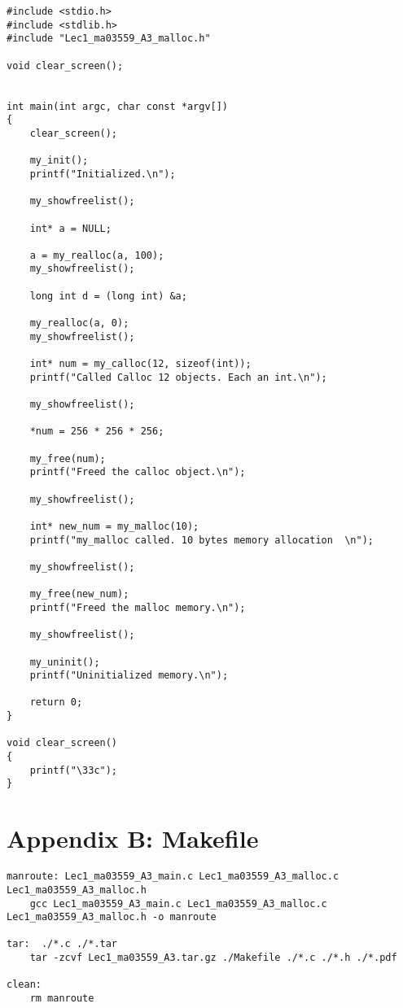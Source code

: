 \documentclass[a4paper]{article}
\begin{document}
\begin{verbatim}
#include <stdio.h>
#include <stdlib.h>
#include "Lec1_ma03559_A3_malloc.h"

void clear_screen();


int main(int argc, char const *argv[])
{
	clear_screen();

	my_init();
	printf("Initialized.\n");

	my_showfreelist();

	int* a = NULL;

	a = my_realloc(a, 100);
	my_showfreelist();

	long int d = (long int) &a;

	my_realloc(a, 0);
	my_showfreelist();

	int* num = my_calloc(12, sizeof(int));
	printf("Called Calloc 12 objects. Each an int.\n");
	
	my_showfreelist();

	*num = 256 * 256 * 256;
	
	my_free(num);
	printf("Freed the calloc object.\n");

	my_showfreelist();

	int* new_num = my_malloc(10);
	printf("my_malloc called. 10 bytes memory allocation  \n");

	my_showfreelist();

	my_free(new_num);
	printf("Freed the malloc memory.\n");
	
	my_showfreelist();
	
	my_uninit();
	printf("Uninitialized memory.\n");
	
	return 0;
}

void clear_screen()
{
	printf("\33c");
}
\end{verbatim}

\section*{Appendix B: Makefile}
\begin{verbatim}
manroute: Lec1_ma03559_A3_main.c Lec1_ma03559_A3_malloc.c Lec1_ma03559_A3_malloc.h
    gcc Lec1_ma03559_A3_main.c Lec1_ma03559_A3_malloc.c Lec1_ma03559_A3_malloc.h -o manroute

tar:  ./*.c ./*.tar
    tar -zcvf Lec1_ma03559_A3.tar.gz ./Makefile ./*.c ./*.h ./*.pdf

clean:
    rm manroute
		
\end{verbatim}

\newpage
\end{document}
